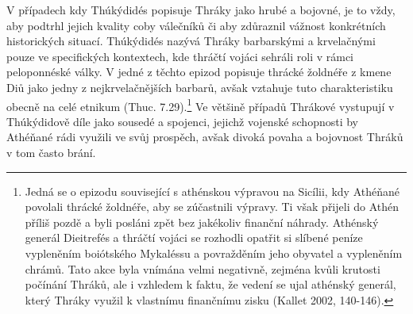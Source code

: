 V případech kdy Thúkýdidés popisuje Thráky jako hrubé a bojovné, je to vždy, aby podtrhl jejich kvality coby válečníků či aby zdůraznil vážnost konkrétních historických situací. Thúkýdidés nazývá Thráky barbarskými a krvelačnými pouze ve specifických kontextech, kde thráčtí vojáci sehráli roli v rámci peloponnéské války. V jedné z těchto epizod popisuje thrácké žoldnéře z kmene Diů jako jedny z nejkrvelačnějších barbarů, avšak vztahuje tuto charakteristiku obecně na celé etnikum (Thuc. 7.29).\footnote{Jedná se o epizodu související s athénskou výpravou na Sicílii, kdy Athéňané povolali thrácké žoldnéře, aby se zúčastnili výpravy. Ti však přijeli do Athén příliš pozdě a byli posláni zpět bez jakékoliv finanční náhrady. Athénský generál Dieitrefés a thráčtí vojáci se rozhodli opatřit si slíbené peníze vypleněním boiótského Mykaléssu a povražděním jeho obyvatel a vypleněním chrámů. Tato akce byla vnímána velmi negativně, zejména kvůli krutosti počínání Thráků, ale i vzhledem k faktu, že vedení se ujal athénský generál, který Thráky využil k vlastnímu finančnímu zisku (Kallet 2002, 140-146).} Ve většině případů Thrákové vystupují v Thúkýdidově díle jako sousedé a spojenci, jejichž vojenské schopnosti by Athéňané rádi využili ve svůj prospěch, avšak divoká povaha a bojovnost Thráků v tom často brání.

